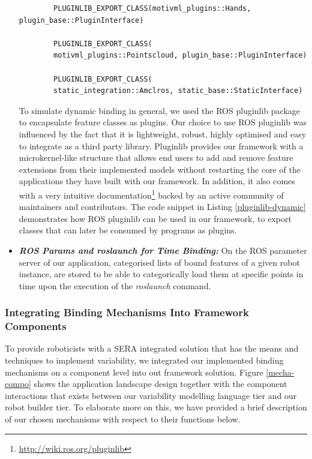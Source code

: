 \documentclass[conference]{IEEEtran}
\newcommand{\foot}[1]{\footnote{\url{#1}}}
\begin{document}
\begin{itemize}
\begin{listing}[H]
\begin{verbatim}
		PLUGINLIB_EXPORT_CLASS(motivml_plugins::Hands, plugin_base::PluginInterface)
		
		PLUGINLIB_EXPORT_CLASS(
		motivml_plugins::Pointscloud, plugin_base::PluginInterface)
		
		PLUGINLIB_EXPORT_CLASS(
		static_integration::Amclros, static_base::StaticInterface)
		\end{verbatim}
		\label{pluginlib-dynamic}
	\end{listing}

To simulate dynamic binding in general, we used the ROS pluginlib package to encapsulate feature classes as plugins. Our choice to use ROS pluginlib was influenced by the fact that it is lightweight, robust, highly optimised and easy to integrate as a third party library. Pluginlib provides our framework with a microkernel-like structure that allows end users to add and remove feature extensions from their implemented models without restarting the core of the applications they have built with our framework. In addition, it also comes with a very intuitive documentation\foot{http://wiki.ros.org/pluginlib} backed by an active community of maintainers and contributors. The code snippet in Listing \ref{pluginlib-dynamic} demonstrates how ROS pluginlib can be used in our framework, to export classes that can later be consumed by programs as plugins.\\

\item \textit{\textbf{ROS Params and roslaunch for Time Binding:}} On the ROS parameter server of our application, categorised lists of bound features of a given robot instance, are stored to be able to categorically load them at specific points in time upon the execution of the \textit{roslaunch} command.
\end{itemize}
\subsubsection{Integrating Binding Mechanisms Into Framework Components}
To provide roboticists with a SERA integrated solution that has the means
and techniques to implement variability, we integrated our implemented binding mechanisms on a component level into out framework solution.  Figure \ref{mecha-compo} shows the application landscape design together with the component interactions that exists between our variability modelling language tier and our robot builder tier. To elaborate more on this, we have provided a brief description of our chosen mechanisms with respect to their functions below.
\end{document}
